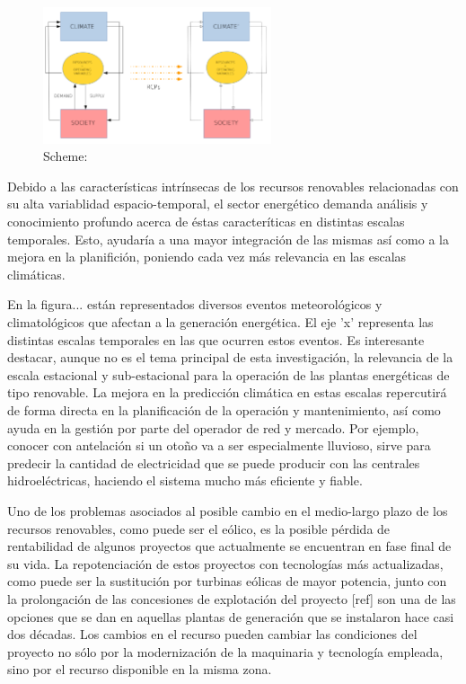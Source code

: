 \begin{figure}[h!]
\centering\includegraphics[width=0.6\textwidth]{figs/esquema.pdf}
\caption{Scheme: }
\label{fig:feedback}
\end{figure}

Debido a las características intrínsecas de los recursos renovables relacionadas con su alta variablidad espacio-temporal, el sector energético demanda análisis y conocimiento profundo acerca de éstas caracteríticas en distintas escalas temporales. Esto, ayudaría a una mayor integración de las mismas así como a la mejora en la planifición, poniendo cada vez más relevancia en las escalas climáticas.

En la figura... están representados diversos eventos meteorológicos y climatológicos que afectan a la generación energética. El eje 'x' representa las distintas escalas temporales en las que ocurren estos eventos. Es interesante destacar, aunque no es el tema principal de esta investigación, la relevancia de la escala estacional y sub-estacional para la operación de las plantas energéticas de tipo renovable. La mejora en la predicción climática en estas escalas repercutirá de forma directa en la planificación de la operación y mantenimiento, así como ayuda en la gestión por parte del operador de red y mercado. Por ejemplo, conocer con antelación si un otoño va a ser especialmente lluvioso, sirve para predecir la cantidad de electricidad que se puede producir con las centrales hidroeléctricas, haciendo el sistema mucho más eficiente y fiable. 

Uno de los problemas asociados al posible cambio en el medio-largo plazo de los recursos renovables, como puede ser el eólico, es la posible pérdida de rentabilidad de algunos proyectos que actualmente se encuentran en fase final de su vida. La repotenciación de estos proyectos con tecnologías más actualizadas, como puede ser la sustitución por turbinas eólicas de mayor potencia, junto con la prolongación de las concesiones de explotación del proyecto [ref] son una de las opciones que se dan en aquellas plantas de generación que se instalaron hace casi dos décadas. Los cambios en el recurso pueden cambiar las condiciones del proyecto no sólo por la modernización de la maquinaria y tecnología empleada, sino por el recurso disponible en la misma zona.


